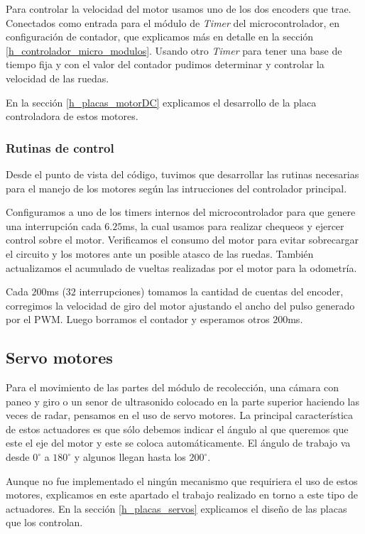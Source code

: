 Para controlar la velocidad del motor usamos uno de los dos encoders que trae.
Conectados como entrada para el m\'odulo de \emph{Timer} del microcontrolador, en configuraci\'on de contador, que explicamos m\'as en detalle en la
secci\'on \ref{h_controlador_micro_modulos}.
Usando otro \emph{Timer} para tener una base de tiempo fija y con el valor del contador pudimos determinar y controlar la velocidad de las ruedas.

En la secci\'on \ref{h_placas_motorDC} explicamos el desarrollo de la placa controladora de estos motores.

\subsubsection{Rutinas de control}
\label{h_actuadores_motorDC_rutinas}

Desde el punto de vista del c\'odigo, tuvimos que desarrollar las rutinas necesarias para el manejo de los motores seg\'un las intrucciones del
controlador principal.

Configuramos a uno de los timers internos del microcontrolador para que genere una interrupci\'on cada $6.25$ms, la cual usamos para realizar
chequeos y ejercer control sobre el motor.
Verificamos el consumo del motor para evitar sobrecargar el circuito y los motores ante un posible atasco de las ruedas.
Tambi\'en actualizamos el acumulado de vueltas realizadas por el motor para la odometr\'ia.

Cada $200$ms ($32$ interrupciones) tomamos la cantidad de cuentas del encoder, corregimos la velocidad de giro del motor ajustando el
ancho del pulso generado por el PWM.
Luego borramos el contador y esperamos otros $200$ms.

\subsection{Servo motores}
\label{h_actuadores_servo}

Para el movimiento de las partes del m\'odulo de recolecci\'on, una c\'amara con paneo y giro o un senor de ultrasonido colocado
en la parte superior haciendo las veces de radar, pensamos en el uso de servo motores.
La principal caracter\'istica de estos actuadores es que s\'olo debemos indicar el \'angulo al que queremos que este
el eje del motor y este se coloca autom\'aticamente.
El \'angulo de trabajo va desde $0^{\circ}$ a $180^{\circ}$ y algunos llegan hasta los $200^{\circ}$.

Aunque no fue implementado el ning\'un mecanismo que requiriera el uso de estos motores, explicamos en este apartado el trabajo realizado
en torno a este tipo de actuadores.
En la secci\'on \ref{h_placas_servos} explicamos el dise\~no de las placas que los controlan.

